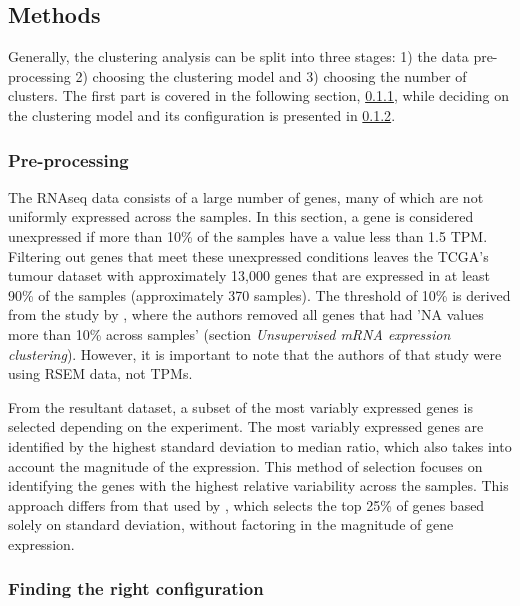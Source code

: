 \subsection{Methods} \label{s:cs:methods}



Generally, the clustering analysis can be split into three stages: 1) the data pre-processing 2) choosing the clustering model and 3) choosing the number of clusters. The first part is covered in the following section, \ref{s:cs:pre-processing}, while deciding on the clustering model and its configuration is presented in \cref{s:cs:right_config}.


\subsubsection{Pre-processing} \label{s:cs:pre-processing}

The RNAseq data consists of a large number of genes, many of which are not uniformly expressed across the samples. In this section, a gene is considered unexpressed if more than 10\% of the samples have a value less than 1.5 TPM. Filtering out genes that meet these unexpressed conditions leaves the TCGA's tumour dataset with approximately 13,000 genes that are expressed in at least 90\% of the samples (approximately 370 samples). The threshold of 10\% is derived from the study by \citet{Robertson2017-mg}, where the authors removed all genes that had 'NA values more than 10\% across samples' (section \textit{Unsupervised mRNA expression clustering}). However, it is important to note that the authors of that study were using RSEM data, not TPMs.

From the resultant dataset, a subset of the most variably expressed genes is selected depending on the experiment. The most variably expressed genes are identified by the highest standard deviation to median ratio, which also takes into account the magnitude of the expression. This method of selection focuses on identifying the genes with the highest relative variability across the samples. This approach differs from that used by \citet{Robertson2017-mg}, which selects the top 25\% of genes based solely on standard deviation, without factoring in the magnitude of gene expression.


\subsubsection{Finding the right configuration} \label{s:cs:right_config}

